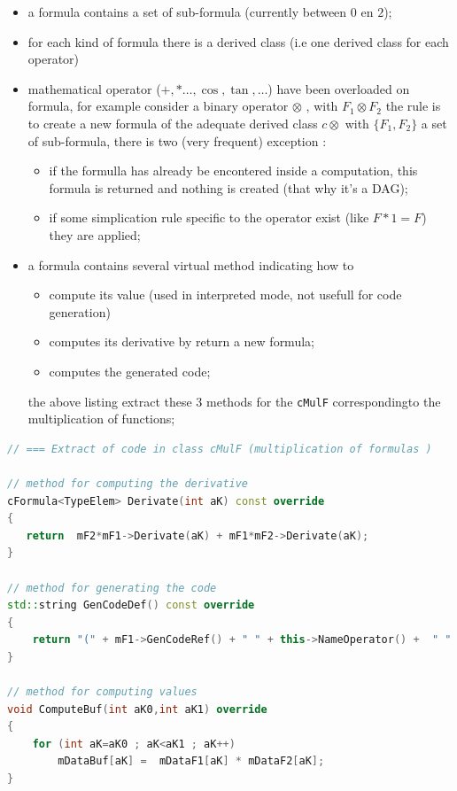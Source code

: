 \begin{itemize}
       \item  a formula contains a set of sub-formula (currently between $0$ en $2$);

       \item  for each kind of formula there is a derived class (i.e one derived class for each operator)

       \item  mathematical operator ($+,*\dots ,\cos,\tan,\dots$) have been overloaded on formula, 
               for example consider a binary operator  $\otimes$ , with $F_1\otimes F_2$  the rule is to create a new formula
               of the adequate derived class $c\otimes$ with  $\{F_1,F_2\}$ a set of sub-formula,
		there is two (very frequent) exception :

               \begin{itemize}
                    \item if the formulla has already be encontered inside a computation, this formula is returned
                          and nothing is created (that why it's a DAG);
		  \item if some simplication rule specific to the operator exist (like $F*1=F$) they are applied;
               \end{itemize}
	       
        \item  a formula contains several virtual method indicating how to 
               \begin{itemize}
		       \item  compute its value (used in interpreted mode, not usefull for code generation)
		       \item  computes its derivative by return a new formula;
		       \item  computes the generated code;
               \end{itemize}

		the above listing extract these $3$ methods for the {\tt cMulF} correspondingto the multiplication
		of functions;
\end{itemize}


\begin{lstlisting}[language=c++]
// === Extract of code in class cMulF (multiplication of formulas )

// method for computing the derivative
cFormula<TypeElem> Derivate(int aK) const override
{
   return  mF2*mF1->Derivate(aK) + mF1*mF2->Derivate(aK);
}

// method for generating the code
std::string GenCodeDef() const override 
{
    return "(" + mF1->GenCodeRef() + " " + this->NameOperator() +  " " + mF2->GenCodeRef() + ")";
}

// method for computing values
void ComputeBuf(int aK0,int aK1) override
{
    for (int aK=aK0 ; aK<aK1 ; aK++)
        mDataBuf[aK] =  mDataF1[aK] * mDataF2[aK];
}
\end{lstlisting}

